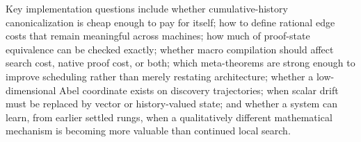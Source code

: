 Key implementation questions include whether cumulative-history canonicalization is cheap enough to pay for itself; how to define rational edge costs that remain meaningful across machines; how much of proof-state equivalence can be checked exactly; whether macro compilation should affect search cost, native proof cost, or both; which meta-theorems are strong enough to improve scheduling rather than merely restating architecture; whether a low-dimensional Abel coordinate exists on discovery trajectories; when scalar drift must be replaced by vector or history-valued state; and whether a system can learn, from earlier settled rungs, when a qualitatively different mathematical mechanism is becoming more valuable than continued local search.
